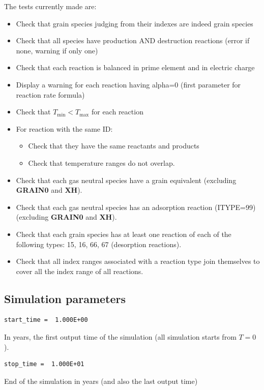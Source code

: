 \documentclass[english,a4paper,twoside]{article}
\begin{document}
The tests currently made are:
\begin{itemize}
\item Check that grain species judging from their indexes are indeed grain species
\item Check that all species have production AND destruction reactions (error if none, warning if only one)
\item Check that each reaction is balanced in prime element and in electric charge
\item Display a warning for each reaction having alpha=0 (first parameter for reaction rate formula)
\item Check that $T_\text{min} < T_\text{max}$ for each reaction
\item For reaction with the same ID:
\begin{itemize}
\item Check that they have the same reactants and products
\item Check that temperature ranges do not overlap.
\end{itemize}
\item Check that each gas neutral species have a grain equivalent (excluding \textbf{GRAIN0} and \textbf{XH}).
\item Check that each gas neutral species has an adsorption reaction (ITYPE=99) (excluding \textbf{GRAIN0} and \textbf{XH}).
\item Check that each grain species has at least one reaction of each of the following types: 15, 16, 66, 67 (desorption reactions).
\item Check that all index ranges associated with a reaction type join themselves to cover all the index range of all reactions.
\end{itemize}

\subsection{Simulation parameters}
\begin{verbatim}
start_time =  1.000E+00
\end{verbatim}
In years, the first output time of the simulation (all simulation starts from $T=0$).

\begin{verbatim}
stop_time =  1.000E+01
\end{verbatim}
End of the simulation in years (and also the last output time)
\end{document}
